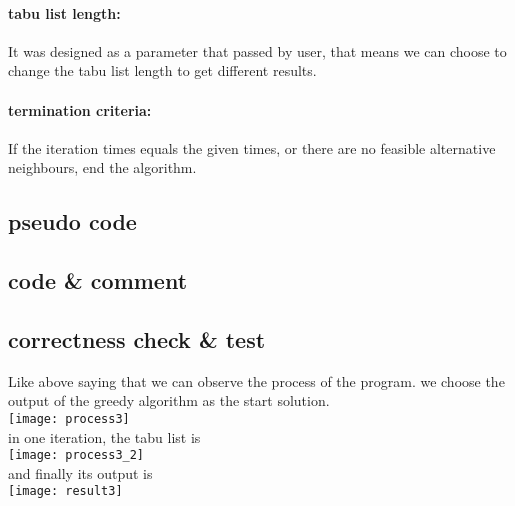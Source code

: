 \documentclass{article}
\begin{document}
\paragraph{tabu list length:}It was designed as a parameter that passed by user, that means we can choose to change the tabu list length to get different results.
\paragraph{termination criteria:}If the iteration times equals the given times, or there are no feasible alternative neighbours, end the algorithm.
\subsection{pseudo code}

\subsection{code \& comment}

\subsection{correctness check \& test}
Like above saying that we can observe the process of the program.
we choose the output of the greedy algorithm as the start solution.\\
\texttt{[image: process3]}\\
in one iteration, the tabu list is\\
\texttt{[image: process3\_2]}\\
and finally its output is\\
\texttt{[image: result3]}\\
\end{document}

